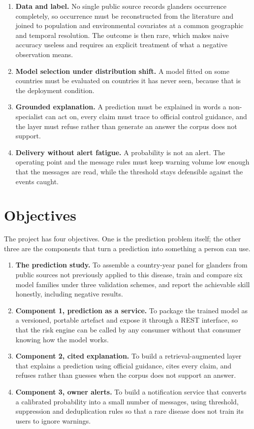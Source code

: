 \documentclass[10pt,openany]{report}
\begin{document}
\begin{enumerate}
  \item \textbf{Data and label.} No single public source records glanders occurrence completely, so
        occurrence must be reconstructed from the literature and joined to population and
        environmental covariates at a common geographic and temporal resolution. The outcome is then
        rare, which makes naive accuracy useless and requires an explicit treatment of what a
        negative observation means.
  \item \textbf{Model selection under distribution shift.} A model fitted on some countries must
        be evaluated on countries it has never seen, because that is the deployment condition.
  \item \textbf{Grounded explanation.} A prediction must be explained in words a non-specialist can
        act on, every claim must trace to official control guidance, and the layer must refuse
        rather than generate an answer the corpus does not support.
  \item \textbf{Delivery without alert fatigue.} A probability is not an alert. The operating point
        and the message rules must keep warning volume low enough that the messages are read, while
        the threshold stays defensible against the events caught.
\end{enumerate}

\section{Objectives}

The project has four objectives. One is the prediction problem itself; the other three are the
components that turn a prediction into something a person can use.

\begin{enumerate}
  \item \textbf{The prediction study.} To assemble a country-year panel for glanders from public sources not
        previously applied to this disease, train and compare six model families under three
        validation schemes, and report the achievable skill honestly, including negative results.
  \item \textbf{Component 1, prediction as a service.} To package the trained model as a versioned,
        portable artefact and expose it through a REST interface, so that the risk engine can be
        called by any consumer without that consumer knowing how the model works.
  \item \textbf{Component 2, cited explanation.} To build a retrieval-augmented layer that explains
        a prediction using official guidance, cites every claim, and refuses rather than guesses
        when the corpus does not support an answer.
  \item \textbf{Component 3, owner alerts.} To build a notification service that converts a
        calibrated probability into a small number of messages, using threshold, suppression and
        deduplication rules so that a rare disease does not train its users to ignore warnings.
\end{enumerate}
\end{document}
